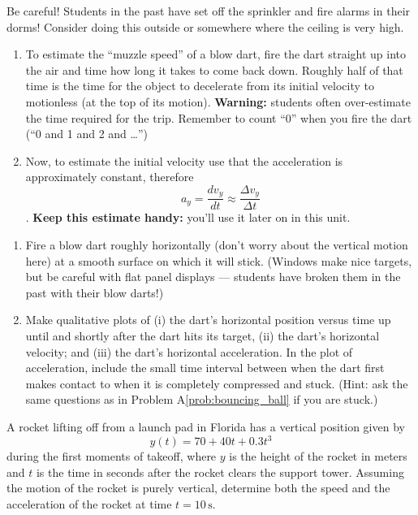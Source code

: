 \begin{exercise}
  \label{prob:dartI}
  Be careful!  Students in the past have set off the sprinkler and
  fire alarms in their dorms!  Consider doing this outside or
  somewhere where the ceiling is very high.
  \begin{enumerate}
  \item To estimate the ``muzzle speed'' of a blow dart, fire the dart
    straight up into the air and time how long it takes to come back
    down.  Roughly half of that time is the time for the object to
    decelerate from its initial velocity to motionless (at the top of
    its motion).  \textbf{Warning:} students often over-estimate the time
    required for the trip.  Remember to count ``0'' when you fire the
    dart (``0 and 1 and 2 and \dots'')

  \item Now, to estimate the initial velocity   
    use that the acceleration is approximately constant, therefore 
    \[ a_y= \frac{{ d}v_y}{{ d}t} \approx \frac{\Delta v_y}{\Delta t} \] .
      \textbf{Keep this estimate handy:} you'll use it
    later on in this unit.
  \end{enumerate}
\end{exercise}


\begin{exercise}
  \begin{enumerate}
  \item Fire a blow dart roughly horizontally (don't worry about the
    vertical motion here) at a smooth surface on which it will
    stick. (Windows make nice targets, but be careful with flat panel
    displays --- students have broken them in the past with their blow
    darts!)

  \item Make qualitative plots of (i) the dart's horizontal position
    versus time up until and shortly after the dart hits its target,
    (ii) the dart's horizontal velocity; and (iii) the dart's
    horizontal acceleration.  In the plot of acceleration, include the
    small time interval between when the dart first makes contact to
    when it is completely compressed and stuck.  (Hint: ask the same
    questions as in Problem A\ref{prob:bouncing_ball} if you are
    stuck.)
  \end{enumerate}
\end{exercise}

\begin{exercise}
  A rocket lifting off from a launch pad in Florida has a vertical
  position given by
  \[ y(t) = 70 + 40t + 0.3t^3 \] during the first moments of takeoff,
  where $y$ is the height of the rocket in meters and $t$ is the time
  in seconds after the rocket clears the support tower.  Assuming the
  motion of the rocket is purely vertical, determine both the speed
  and the acceleration of the rocket at time $t = 10\,\text{s}$.
  \label{prob:rocket_motion}
\end{exercise}



